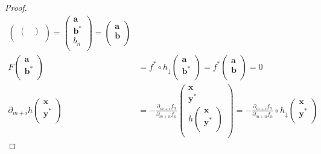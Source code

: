 \documentclass[dvipdfmx]{jsarticle}
\begin{document}
\begin{proof}
\begin{align*}
\begin{pmatrix}
\begin{pmatrix}
\end{pmatrix} \\
\end{pmatrix} = \begin{pmatrix}
\mathbf{a} \\
\mathbf{b}^{*} \\
b_{n} \\
\end{pmatrix} = \begin{pmatrix}
\mathbf{a} \\
\mathbf{b} \\
\end{pmatrix}\\
F\begin{pmatrix}
\mathbf{a} \\
\mathbf{b}^{*} \\
\end{pmatrix} &= f^{*} \circ h_{\downarrow}\begin{pmatrix}
\mathbf{a} \\
\mathbf{b}^{*} \\
\end{pmatrix} = f^{*}\begin{pmatrix}
\mathbf{a} \\
\mathbf{b} \\
\end{pmatrix} = 0\\
\partial_{m + i}h\begin{pmatrix}
\mathbf{x} \\
\mathbf{y}^{*} \\
\end{pmatrix} &= - \frac{\partial_{m + i}f_{n}}{\partial_{m + n}f_{n}}\begin{pmatrix}
\mathbf{x} \\
\mathbf{y}^{*} \\
h\begin{pmatrix}
\mathbf{x} \\
\mathbf{y}^{*} \\
\end{pmatrix} \\
\end{pmatrix} = - \frac{\partial_{m + i}f_{n}}{\partial_{m + n}f_{n}} \circ h_{\downarrow}\begin{pmatrix}
\mathbf{x} \\
\mathbf{y}^{*} \\
\end{pmatrix}
\end{align*}\par

\end{proof}
\end{document}
